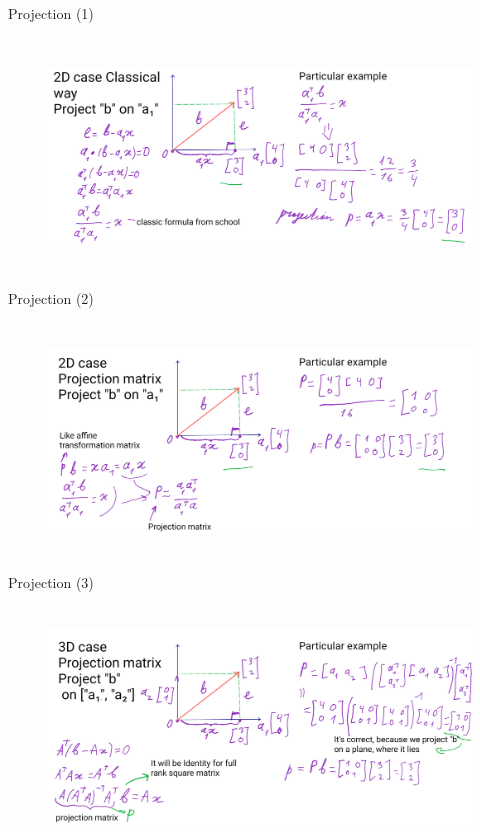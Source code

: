 \documentclass[aspectratio=169,notes]{beamer}
\begin{document}
\begin{frame}[t]{Projection (1)}
    \framesubtitle{}
    \begin{figure}[H]
        \centering\includegraphics[height=6cm,width=1\textwidth,keepaspectratio]{AGLA2_for_slides_1.png}
        \label{fig:AGLA2_for_slides_1.png}
    \end{figure}
\end{frame}

\begin{frame}[t]{Projection (2)}
    \framesubtitle{}
    \begin{figure}[H]
        \centering\includegraphics[height=6cm,width=1\textwidth,keepaspectratio]{AGLA2_for_slides_2.png}
        \label{fig:AGLA2_for_slides_2.png}
    \end{figure}
\end{frame}

\begin{frame}[t]{Projection (3)}
    \framesubtitle{}
    \begin{figure}[H]
        \centering\includegraphics[height=6cm,width=1\textwidth,keepaspectratio]{AGLA2_for_slides_3.png}
        \label{fig:AGLA2_for_slides_3.png}
    \end{figure}
\end{frame}
\end{document}
